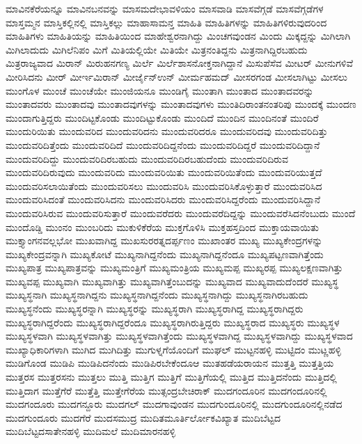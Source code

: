 {ಮಾವಿನಕೆರೆಯನ್ನೂ
ಮಾವಿನಬನವನ್ನು
ಮಾಸಮದೇಭಾವಳಿಯಂ
ಮಾಸವಾಡಿ
ಮಾಸವೆಗ್ಗಡೆ
ಮಾಸವೆಗ್ಗಡೆಗಳ
ಮಾಸ್ತಮ್ಮನ
ಮಾಸ್ತಿಕಲ್ಲಿನಲ್ಲಿ
ಮಾಸ್ತಿಕಲ್ಲು
ಮಾಹಾಸಾಮನ್ತ
ಮಾಹಿತಿ
ಮಾಹಿತಿಗಳನ್ನು
ಮಾಹಿತಿಗಳಿರುವುದರಿಂದ
ಮಾಹಿತಿಗಳು
ಮಾಹಿತಿಯನ್ನು
ಮಾಹಿತಿಯಿಂದ
ಮಾಹೇಶ್ವರನಾಗಿದ್ದು
ಮಿಂಚಗವುಂಡನ
ಮಿಂದು
ಮಿಕ್ಕದ್ದನ್ನು
ಮಿಗಿಲಾಗಿ
ಮಿಗಿಲಾದುದು
ಮಿಗಿಲೆನಿಪಂ
ಮಿಗೆ
ಮಿತಿಯಲ್ಲಿಯೇ
ಮಿತಿಯೇ
ಮಿತ್ರನಂತಿದ್ದನು
ಮಿತ್ರನಾಗಿದ್ದಿರಬಹುದು
ಮಿತ್ರರಾಜ್ಯವಾದ
ಮಿರಾನ್
ಮಿರುಹನಗಣ್ಯ
ಮಿರ್ಲೆ
ಮಿರ್ಲೆಶಾಸನೋಕ್ತನಾಗಿದ್ದಾನೆ
ಮಿಸುಪೆಸೆವ
ಮೀಟರ್
ಮೀನುಗಳಿವೆ
ಮೀರಿಸಿದನು
ಮೀರ್
ಮೀರ್ಇಮಿರಾನ್
ಮೀರ್ಜೈನ್ಉನ್
ಮೀರ್ಮಹಮದ್
ಮೀಸರಗಂಡ
ಮೀಸಲಾಗಿಟ್ಟು
ಮೀಸಲು
ಮುಂಗೊಳ
ಮುಂಚೆ
ಮುಂಚೆಯೇ
ಮುಂಜಿಯನೂ
ಮುಂಡಿಗೈ
ಮುಂತಾಗಿ
ಮುಂತಾದ
ಮುಂತಾದವರನ್ನು
ಮುಂತಾದವರು
ಮುಂತಾದವು
ಮುಂತಾದವುಗಳನ್ನು
ಮುಂತಾದವುಗಳು
ಮುಂತಿದಿರಾಂತನಂತರಿಪು
ಮುಂದಕ್ಕೆ
ಮುಂದಣ
ಮುಂದಾಗುತ್ತಿದ್ದರು
ಮುಂದಿಟ್ಟಕೊಂಡು
ಮುಂದಿಟ್ಟುಕೊಂಡು
ಮುಂದಿದೆ
ಮುಂದಿನ
ಮುಂದಿನಂತೆ
ಮುಂದಿರೆ
ಮುಂದುರಿಯಿತು
ಮುಂದುವರಿದ
ಮುಂದುವರಿದನು
ಮುಂದುವರಿದರೂ
ಮುಂದುವರಿದವು
ಮುಂದುವರಿದಿತ್ತು
ಮುಂದುವರಿದಿತ್ತೆಂದು
ಮುಂದುವರಿದಿದೆ
ಮುಂದುವರಿದಿದ್ದನೆಂದು
ಮುಂದುವರಿದಿದ್ದರೆ
ಮುಂದುವರಿದಿದ್ದಾನೆ
ಮುಂದುವರಿದಿದ್ದು
ಮುಂದುವರಿದಿರಬಹುದು
ಮುಂದುವರಿದಿರಬಹುದೆಂದು
ಮುಂದುವರಿದಿರುವ
ಮುಂದುವರಿದಿರುವುದು
ಮುಂದುವರಿದು
ಮುಂದುವರಿಯಿತು
ಮುಂದುವರಿಯಿತೆಂದು
ಮುಂದುವರಿಯುತ್ತದೆ
ಮುಂದುವರಿಸಲಾಯಿತೆಂದು
ಮುಂದುವರಿಸಲು
ಮುಂದುವರಿಸಿ
ಮುಂದುವರಿಸಿಕೊಳ್ಳುತ್ತಾರೆ
ಮುಂದುವರಿಸಿದ
ಮುಂದುವರಿಸಿದಂತೆ
ಮುಂದುವರಿಸಿದನು
ಮುಂದುವರಿಸಿದರು
ಮುಂದುವರಿಸಿದ್ದರೆಂದು
ಮುಂದುವರಿಸಿದ್ದಾನೆ
ಮುಂದುವರಿಸಿರುವ
ಮುಂದುವರಿಸುತ್ತಾರೆ
ಮುಂದುವರೆದರು
ಮುಂದುವರೆದಿದ್ದನ್ನು
ಮುಂದುವರೆಸಿದನೆಂಬುದು
ಮುಂದೆ
ಮುಂದೊಡ್ಡಿ
ಮುಂನಂ
ಮುಂಬರಿದು
ಮುಕುಳಿಕೆರೆಯ
ಮುಕ್ತಗೊಳಿಸಿ
ಮುಕ್ತಹಸ್ತದಿಂದ
ಮುಕ್ತಾಯವಾಯಿತು
ಮುಕ್ತ್ಯಾಂಗನವಲ್ಲಭೋ
ಮುಖವಾಗಿದ್ದ
ಮುಖಸುರರತ್ನದರ್ಪ್ಪಣಂ
ಮುಖಾಂತರ
ಮುಖ್ಯ
ಮುಖ್ಯಕೇಂದ್ರಗಳನ್ನು
ಮುಖ್ಯಕೇಂದ್ರವನ್ನಾಗಿ
ಮುಖ್ಯಕೋಟೆ
ಮುಖ್ಯನಾಗಿದ್ದನೆಂದು
ಮುಖ್ಯನಾಗಿದ್ದನೆಂದೂ
ಮುಖ್ಯಪಟ್ಟಣವಾಗಿತ್ತೆಂದು
ಮುಖ್ಯಪಾತ್ರ
ಮುಖ್ಯಪಾತ್ರವನ್ನು
ಮುಖ್ಯಮಂತ್ರಿಗೆ
ಮುಖ್ಯಮಂತ್ರಿಯ
ಮುಖ್ಯಮಪ್ಪ
ಮುಖ್ಯರಪ್ಪ
ಮುಖ್ಯಲಕ್ಷಣವಾಗಿತ್ತು
ಮುಖ್ಯವಪ್ಪ
ಮುಖ್ಯವಾಗಿ
ಮುಖ್ಯವಾಗಿತ್ತು
ಮುಖ್ಯವಾಗಿತ್ತೆಂಬುದನ್ನು
ಮುಖ್ಯವಾದ
ಮುಖ್ಯವಾದುದೆಂದರೆ
ಮುಖ್ಯಸ್ಥ
ಮುಖ್ಯಸ್ಥನಾಗಿ
ಮುಖ್ಯಸ್ಥನಾಗಿದ್ದನು
ಮುಖ್ಯಸ್ಥನಾಗಿದ್ದನೆಂದು
ಮುಖ್ಯಸ್ಥನಾಗಿದ್ದು
ಮುಖ್ಯಸ್ಥನಾಗಿರಬಹುದು
ಮುಖ್ಯಸ್ಥನೆಂದು
ಮುಖ್ಯಸ್ಥರನ್ನಾಗಿ
ಮುಖ್ಯಸ್ಥರನ್ನು
ಮುಖ್ಯಸ್ಥರಾಗಿ
ಮುಖ್ಯಸ್ಥರಾಗಿದ್ದ
ಮುಖ್ಯಸ್ಥರಾಗಿದ್ದರು
ಮುಖ್ಯಸ್ಥರಾಗಿದ್ದರೆಂದು
ಮುಖ್ಯಸ್ಥರಾಗಿದ್ದರೆಂದೂ
ಮುಖ್ಯಸ್ಥರಾಗಿರುತ್ತಿದ್ದರು
ಮುಖ್ಯಸ್ಥರಾದ
ಮುಖ್ಯಸ್ಥರು
ಮುಖ್ಯಸ್ಥಳ
ಮುಖ್ಯಸ್ಥಳವಾಗಿ
ಮುಖ್ಯಸ್ಥಳವಾಗಿತ್ತು
ಮುಖ್ಯಸ್ಥಳವಾಗಿತ್ತೆಂದು
ಮುಖ್ಯಸ್ಥಳವಾಗಿದ್ದ
ಮುಖ್ಯಸ್ಥಳವಾಗಿದ್ದು
ಮುಖ್ಯಸ್ಥಳವಾದ
ಮುಖ್ಯಾಧಿಕಾರಿಗಳಾಗಿ
ಮುಗಿದ
ಮುಗಿದಿತ್ತು
ಮುಗುಳ್ನಗೆಯೊಂದಿಗೆ
ಮುಘಲ್
ಮುಟ್ಟನಹಳ್ಳಿ
ಮುಟ್ಟಿದಂ
ಮುಟ್ಣಹಳ್ಳಿ
ಮುಡಿಗೊಂಡ
ಮುಡಿಪಿ
ಮುಡಿಪಿದನೆಂದು
ಮುಡಿಪಿರಬೇಕೆಂದೂಆ
ಮುತಹಡೆಯರಾಯನ
ಮುತ್ತತ್ತಿ
ಮುತ್ತತ್ತಿಯ
ಮುತ್ತರಸ
ಮುತ್ತರಸನು
ಮುತ್ತಲು
ಮುತ್ತಿ
ಮುತ್ತಿಗ
ಮುತ್ತಿಗೆ
ಮುತ್ತಿಗೆಯಲ್ಲಿ
ಮುತ್ತಿದ
ಮುತ್ತಿದನೆಂದು
ಮುತ್ತಿದಲ್ಲಿ
ಮುತ್ತಿದಾಗ
ಮುತ್ತೆಗೆರೆ
ಮುತ್ತೆತ್ತಿ
ಮುತ್ತೇಗೆರೆಯ
ಮುತ್ಸಂದ್ರಬೇಚಿರಾಕ್
ಮುದಗಂದೂರಿನ
ಮುದಗಂದೂರಿನಲ್ಲಿ
ಮುದಗಂದೂರು
ಮುದಗನ್ದೂರು
ಮುದಗಲ್
ಮುದಗಾವುಂಡನ
ಮುದಗುಂದೂರಿನಲ್ಲಿ
ಮುದಗುಂದೂರಿನಲ್ಲಿನಡೆದ
ಮುದಗುಂದೂರು
ಮುದಗೆರೆ
ಮುದಸಮುದ್ರ
ಮುದಿತಮೂರ್ತಿರ್ಲೋಕವಿಖ್ಯಾತ
ಮುದಿಬೆಟ್ಟದ
ಮುದಿಬೆಟ್ಟದಸಾತೇನಹಳ್ಳಿ
ಮುದಿಮಲೆ
ಮುದಿಮಾರನಹಳ್ಳಿ
}
